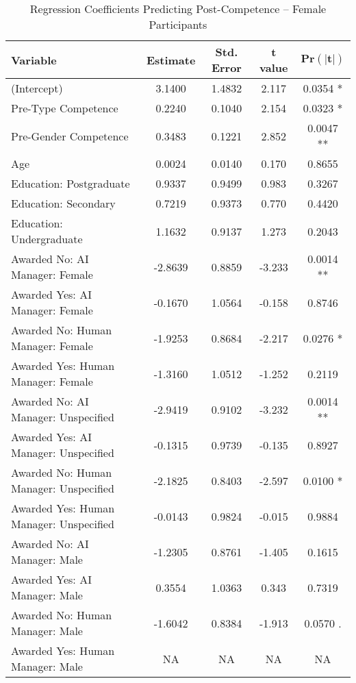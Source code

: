 \begin{table}[ht]
    \centering
    \caption{Regression Coefficients Predicting Post-Competence -- Female Participants}
    \begin{tabular}{lcccc}
        \toprule
        \textbf{Variable} & \textbf{Estimate} & \textbf{Std. Error} & \textbf{t value} & 
        $\mathbf{\text{Pr}(|t|)}$
        \\
        \midrule
        (Intercept) & 3.1400  & 1.4832  & 2.117  & 0.0354 *  \\
        Pre-Type Competence & 0.2240  & 0.1040  & 2.154  & 0.0323 *  \\
        Pre-Gender Competence & 0.3483  & 0.1221  & 2.852  & 0.0047 **  \\
        Age & 0.0024  & 0.0140  & 0.170  & 0.8655  \\
        Education: Postgraduate & 0.9337  & 0.9499  & 0.983  & 0.3267  \\
        Education: Secondary & 0.7219  & 0.9373  & 0.770  & 0.4420  \\
        Education: Undergraduate & 1.1632  & 0.9137  & 1.273  & 0.2043  \\
        Awarded No: AI Manager: Female & -2.8639  & 0.8859  & -3.233  & 0.0014 **  \\
        Awarded Yes: AI Manager: Female & -0.1670  & 1.0564  & -0.158  & 0.8746  \\
        Awarded No: Human Manager: Female & -1.9253  & 0.8684  & -2.217  & 0.0276 *  \\
        Awarded Yes: Human Manager: Female & -1.3160  & 1.0512  & -1.252  & 0.2119  \\
        Awarded No: AI Manager: Unspecified & -2.9419  & 0.9102  & -3.232  & 0.0014 **  \\
        Awarded Yes: AI Manager: Unspecified & -0.1315  & 0.9739  & -0.135  & 0.8927  \\
        Awarded No: Human Manager: Unspecified & -2.1825  & 0.8403  & -2.597  & 0.0100 *  \\
        Awarded Yes: Human Manager: Unspecified & -0.0143  & 0.9824  & -0.015  & 0.9884  \\
        Awarded No: AI Manager: Male & -1.2305  & 0.8761  & -1.405  & 0.1615  \\
        Awarded Yes: AI Manager: Male & 0.3554  & 1.0363  & 0.343  & 0.7319  \\
        Awarded No: Human Manager: Male & -1.6042  & 0.8384  & -1.913  & 0.0570 .  \\
        Awarded Yes: Human Manager: Male & NA  & NA  & NA  & NA  \\

\end{tabular}
\end{table}
